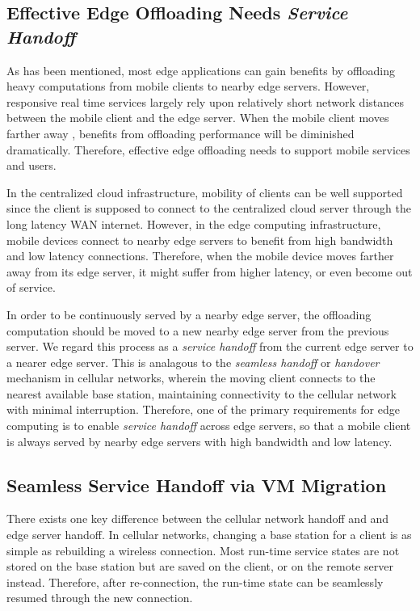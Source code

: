 \subsection{Effective Edge Offloading Needs \textit{Service Handoff}}

As has been mentioned, most edge applications can gain benefits by offloading heavy computations from mobile clients to nearby edge servers. However, responsive real time services largely rely upon relatively short network distances between the mobile client and the edge server. When the mobile client moves farther away 
, benefits from offloading performance will be diminished dramatically.
Therefore, effective edge offloading needs to support mobile services and users.

In the centralized cloud infrastructure, mobility of clients can be well supported since the client is supposed to connect to the centralized cloud server through the long latency WAN internet. However, in the edge computing infrastructure, mobile devices connect to nearby edge servers to benefit from high bandwidth and low latency connections. Therefore, when the mobile device moves farther away from its edge server, it might suffer from higher latency, or even become out of service. 

In order to be continuously served by a nearby edge server, the offloading computation should be moved to a new nearby edge server from the previous server. We regard this process as a \textit{service  handoff} from the current edge server to a nearer edge server. 
This is analagous to the \textit{seamless handoff} or \textit{handover}  mechanism in cellular networks, wherein the moving client connects to the nearest available base station, maintaining connectivity to the cellular network with minimal interruption. 
%
Therefore, one of the primary requirements for edge computing is to enable  \textit{service handoff} across edge servers, so that a mobile client is always served by nearby edge servers with high bandwidth and low latency.

\subsection{Seamless Service Handoff via VM Migration}

There exists one key difference between the cellular network handoff and and edge server handoff.
%
In cellular networks, changing a base station for a client is as simple as rebuilding a wireless connection. Most run-time service states are not stored on the base station but are saved on the client, or on the remote server instead. Therefore, after re-connection, the run-time state can be seamlessly resumed through the new connection. 

